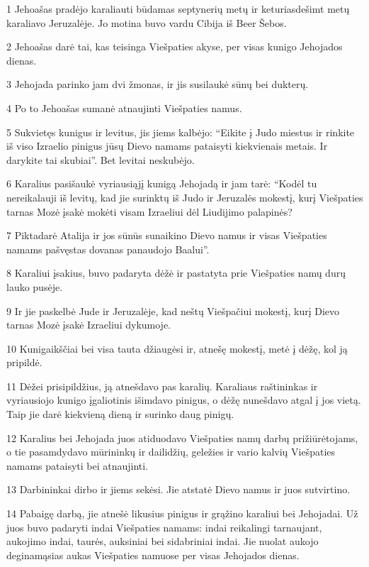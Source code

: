 \par 1 Jehoašas pradėjo karaliauti būdamas septynerių metų ir keturiasdešimt metų karaliavo Jeruzalėje. Jo motina buvo vardu Cibija iš Beer Šebos. 
\par 2 Jehoašas darė tai, kas teisinga Viešpaties akyse, per visas kunigo Jehojados dienas. 
\par 3 Jehojada parinko jam dvi žmonas, ir jis susilaukė sūnų bei dukterų. 
\par 4 Po to Jehoašas sumanė atnaujinti Viešpaties namus. 
\par 5 Sukvietęs kunigus ir levitus, jis jiems kalbėjo: “Eikite į Judo miestus ir rinkite iš viso Izraelio pinigus jūsų Dievo namams pataisyti kiekvienais metais. Ir darykite tai skubiai”. Bet levitai neskubėjo. 
\par 6 Karalius pasišaukė vyriausiąjį kunigą Jehojadą ir jam tarė: “Kodėl tu nereikalauji iš levitų, kad jie surinktų iš Judo ir Jeruzalės mokestį, kurį Viešpaties tarnas Mozė įsakė mokėti visam Izraeliui dėl Liudijimo palapinės? 
\par 7 Piktadarė Atalija ir jos sūnūs sunaikino Dievo namus ir visas Viešpaties namams pašvęstas dovanas panaudojo Baalui”. 
\par 8 Karaliui įsakius, buvo padaryta dėžė ir pastatyta prie Viešpaties namų durų lauko pusėje. 
\par 9 Ir jie paskelbė Jude ir Jeruzalėje, kad neštų Viešpačiui mokestį, kurį Dievo tarnas Mozė įsakė Izraeliui dykumoje. 
\par 10 Kunigaikščiai bei visa tauta džiaugėsi ir, atnešę mokestį, metė į dėžę, kol ją pripildė. 
\par 11 Dėžei prisipildžius, ją atnešdavo pas karalių. Karaliaus raštininkas ir vyriausiojo kunigo įgaliotinis išimdavo pinigus, o dėžę nunešdavo atgal į jos vietą. Taip jie darė kiekvieną dieną ir surinko daug pinigų. 
\par 12 Karalius bei Jehojada juos atiduodavo Viešpaties namų darbų prižiūrėtojams, o tie pasamdydavo mūrininkų ir dailidžių, geležies ir vario kalvių Viešpaties namams pataisyti bei atnaujinti. 
\par 13 Darbininkai dirbo ir jiems sekėsi. Jie atstatė Dievo namus ir juos sutvirtino. 
\par 14 Pabaigę darbą, jie atnešė likusius pinigus ir grąžino karaliui bei Jehojadai. Už juos buvo padaryti indai Viešpaties namams: indai reikalingi tarnaujant, aukojimo indai, taurės, auksiniai bei sidabriniai indai. Jie nuolat aukojo deginamąsias aukas Viešpaties namuose per visas Jehojados dienas. 

